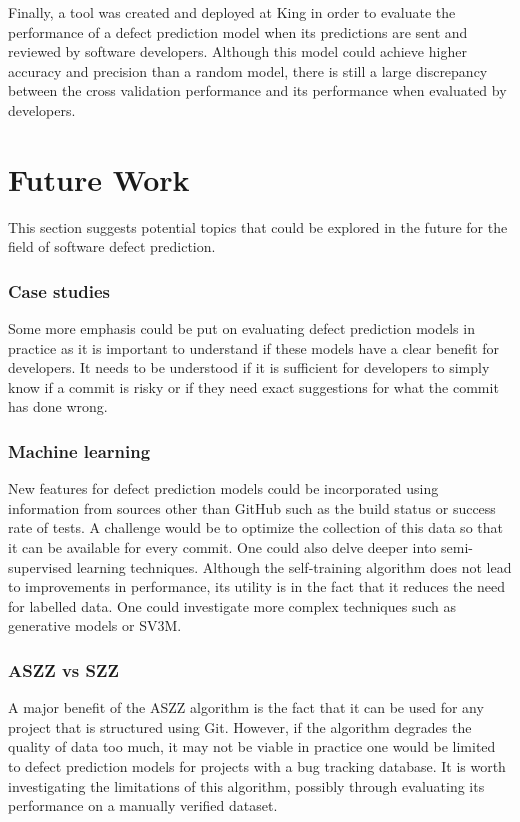 \documentclass[../main.tex]{subfiles}
\begin{document}
Finally, a tool was created and deployed at King in order to evaluate the performance of a defect prediction model when its predictions are sent and reviewed by software developers. Although this model could achieve higher accuracy and precision than a random model, there is still a large discrepancy between the cross validation performance and its performance when evaluated by developers.

\section{Future Work}

This section suggests potential topics that could be explored in the future for the field of software defect prediction. 

\subsubsection{Case studies}

Some more emphasis could be put on evaluating defect prediction models in practice as it is important to understand if these models have a clear benefit for developers. It needs to be understood if it is sufficient for developers to simply know if a commit is risky or if they need exact suggestions for what the commit has done wrong.

\subsubsection{Machine learning}

New features for defect prediction models could be incorporated using information from sources other than GitHub such as the build status or success rate of tests. A challenge would be to optimize the collection of this data so that it can be available for every commit. One could also delve deeper into semi-supervised learning techniques. Although the self-training algorithm does not lead to improvements in performance, its utility is in the fact that it reduces the need for labelled data. One could investigate more complex techniques such as generative models or SV3M. 

\subsubsection{ASZZ vs SZZ}

A major benefit of the ASZZ algorithm is the fact that it can be used for any project that is structured using Git. However, if the algorithm degrades the quality of data too much, it may not be viable in practice one would be limited to defect prediction models for projects with a bug tracking database. It is worth investigating the limitations of this algorithm, possibly through evaluating its performance on a manually verified dataset. 
\end{document}
